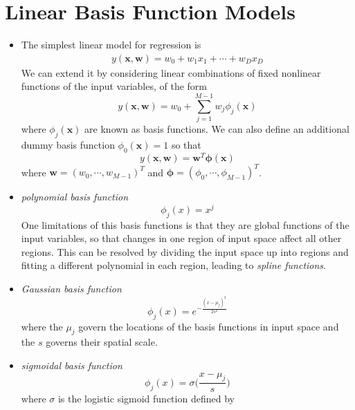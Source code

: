 \documentclass[12pt, a4paper]{article}
\begin{document}
    \section{Linear Basis Function Models}
    \begin{itemize}
        \item The simplest linear model for regression is
        \begin{align*}
            y(\bm{x},\bm{w})=w_0+w_1x_1+\cdots+w_Dx_D
        \end{align*}
        We can extend it by considering linear combinations of fixed nonlinear functions of the input
        variables, of the form
        \begin{equation}
            y(\bm{x},\bm{w})=w_0+\sum_{j=1}^{M-1}w_j\phi_j(\bm{x})
        \end{equation}
        where $\phi_j(\bm{x})$ are known as basis functions. We can also define an additional dummy basis
        function $\phi_0(\bm{x})=1$ so that
        \begin{equation}
            y(\bm{x},\bm{w})=\bm{w}^T\bm{\phi}(\bm{x})
        \end{equation}
        where $\bm{w}=(w_0,\cdots,w_{M-1})^T$ and $\bm{\phi}=(\phi_0,\cdots,\phi_{M-1})^T$.
        \item \textit{polynomial basis function}
        \begin{equation*}
            \phi_j(x)=x^j
        \end{equation*}
        One limitations of this basis functions is that they are global functions of the input variables, 
        so that changes in one region of input space affect all other regions. This can be resolved by 
        dividing the input space up into regions and fitting a different polynomial in each region, leading
        to \textit{spline functions}.
        \item \textit{Gaussian basis function}
        \begin{equation}
            \phi_j(x)=e^{-\frac{(x-\mu_j)^2}{2s^2}}
        \end{equation}
        where the $\mu_j$ govern the locations of the basis functions in input space and the $s$ governs 
        their spatial scale.
        \item \textit{sigmoidal basis function}
        \begin{equation}
            \phi_j(x)=\sigma\Big(\frac{x-\mu_j}{s}\Big)
        \end{equation}
        where $\sigma$ is the logistic sigmoid function defined by

\end{itemize}
\end{document}
